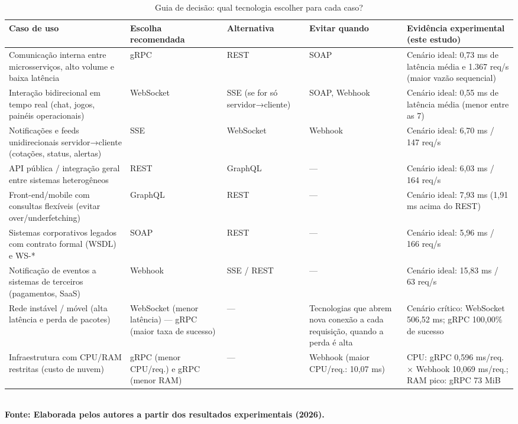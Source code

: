 \begin{table}[H]
\centering
\scriptsize
\caption{Guia de decisão: qual tecnologia escolher para cada caso?}
\label{quadro:guia_decisao}
\begin{tabular}{|p{3.3cm}|p{2.3cm}|p{2.2cm}|p{2.4cm}|p{4.2cm}|}
\hline
\textbf{Caso de uso} & \textbf{Escolha recomendada} & \textbf{Alternativa} & \textbf{Evitar quando} & \textbf{Evidência experimental (este estudo)} \\ \hline
Comunicação interna entre microsserviços, alto volume e baixa latência & gRPC & REST & SOAP & Cenário ideal: 0,73 ms de latência média e 1.367 req/s (maior vazão sequencial) \\ \hline
Interação bidirecional em tempo real (chat, jogos, painéis operacionais) & WebSocket & SSE (se for só servidor→cliente) & SOAP, Webhook & Cenário ideal: 0,55 ms de latência média (menor entre as 7) \\ \hline
Notificações e feeds unidirecionais servidor→cliente (cotações, status, alertas) & SSE & WebSocket & Webhook & Cenário ideal: 6,70 ms / 147 req/s \\ \hline
API pública / integração geral entre sistemas heterogêneos & REST & GraphQL & — & Cenário ideal: 6,03 ms / 164 req/s \\ \hline
Front-end/mobile com consultas flexíveis (evitar over/underfetching) & GraphQL & REST & — & Cenário ideal: 7,93 ms (1,91 ms acima do REST) \\ \hline
Sistemas corporativos legados com contrato formal (WSDL) e WS-* & SOAP & REST & — & Cenário ideal: 5,96 ms / 166 req/s \\ \hline
Notificação de eventos a sistemas de terceiros (pagamentos, SaaS) & Webhook & SSE / REST & — & Cenário ideal: 15,83 ms / 63 req/s \\ \hline
Rede instável / móvel (alta latência e perda de pacotes) & WebSocket (menor latência) — gRPC (maior taxa de sucesso) & — & Tecnologias que abrem nova conexão a cada requisição, quando a perda é alta & Cenário crítico: WebSocket 506,52 ms; gRPC 100,00\% de sucesso \\ \hline
Infraestrutura com CPU/RAM restritas (custo de nuvem) & gRPC (menor CPU/req.) e gRPC (menor RAM) & — & Webhook (maior CPU/req.: 10,07 ms) & CPU: gRPC 0,596 ms/req. × Webhook 10,069 ms/req.; RAM pico: gRPC 73 MiB \\ \hline
\end{tabular}
{\footnotesize\\ \textbf{Fonte: Elaborada pelos autores a partir dos resultados experimentais (2026).}}
\end{table}
